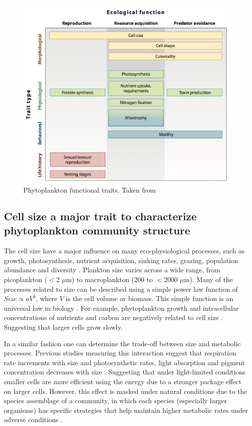 \begin{figure}
\centering
\includegraphics[width=0.7\linewidth]{./Chp1-Intro/Fig_litchman2008.png}
\caption[Scheme]{\small{Phytoplankton functional traits. Taken from \citet{Litchman2008}}}
\label{phytotrait}
\end{figure}

\subsection{Cell size a major trait to characterize phytoplankton community structure}
The cell size have a major influence on many eco-physiological processes, such as growth, photosynthesis, nutrient acquisition, sinking rates, grazing, population abundance and diversity \citep{Finkel2009a}. Plankton size varies across a wide range, from picoplankton ($<$2 $\mu$m) to macroplankton (200 to $<$2000 $\mu$m). Many of the processes related to size can be described using a simple power law function of $Size \propto aV^ b$, where $V$ is the cell volume or biomass. This simple function is an universal law in biology \citep{Platt1981}. For example, phytoplankton growth and intracellular concentrations of nutrients and carbon are negatively related to cell size \citep{Tang1995}. Suggesting that larger cells grow slowly. 

In a similar fashion one can determine the trade-off between size and metabolic processes. Previous studies measuring this interaction suggest that respiration rate increments with size \citep{Laws1975, Lopez-Urrutia2006} and photosynthetic rates, light absorption and pigment concentration decreases with size \citep{Ciotti2002,Finkel2004}. Suggesting that under light-limited conditions smaller cells are more efficient using the energy due to a stronger package effect on larger cells. However, this effect is masked under natural conditions due to the species assemblage of a community, in which each species (especially larger organisms) has specific strategies that help maintain higher metabolic rates under adverse conditions \citep{Maranon2009}. 

